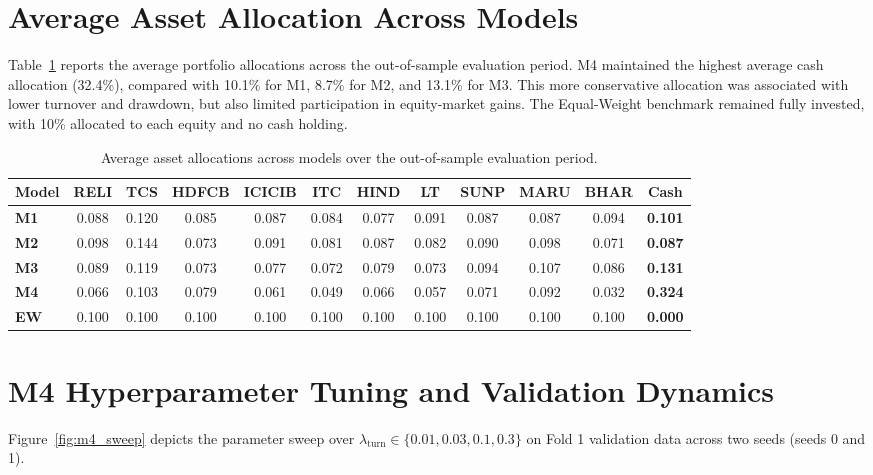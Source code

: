 \section{Average Asset Allocation Across Models}
Table~\ref{tab:avg_weights} reports the average portfolio allocations across the out-of-sample evaluation period. M4 maintained the highest average cash allocation (32.4\%), compared with 10.1\% for M1, 8.7\% for M2, and 13.1\% for M3. This more conservative allocation was associated with lower turnover and drawdown, but also limited participation in equity-market gains. The Equal-Weight benchmark remained fully invested, with 10\% allocated to each equity and no cash holding.

\begin{table}[H]
\centering
\footnotesize
\setlength{\tabcolsep}{3.8pt}
\caption{Average asset allocations across models over the out-of-sample evaluation period.}
\label{tab:avg_weights}
\begin{tabular}{lccccccccccc}
\toprule
\textbf{Model} & \textbf{RELI} & \textbf{TCS} & \textbf{HDFCB} & \textbf{ICICIB} & \textbf{ITC} & \textbf{HIND} & \textbf{LT} & \textbf{SUNP} & \textbf{MARU} & \textbf{BHAR} & \textbf{Cash} \\
\midrule
\textbf{M1} & 0.088 & 0.120 & 0.085 & 0.087 & 0.084 & 0.077 & 0.091 & 0.087 & 0.087 & 0.094 & \textbf{0.101} \\
\textbf{M2} & 0.098 & 0.144 & 0.073 & 0.091 & 0.081 & 0.087 & 0.082 & 0.090 & 0.098 & 0.071 & \textbf{0.087} \\
\textbf{M3} & 0.089 & 0.119 & 0.073 & 0.077 & 0.072 & 0.079 & 0.073 & 0.094 & 0.107 & 0.086 & \textbf{0.131} \\
\textbf{M4} & 0.066 & 0.103 & 0.079 & 0.061 & 0.049 & 0.066 & 0.057 & 0.071 & 0.092 & 0.032 & \textbf{0.324} \\
\textbf{EW} & 0.100 & 0.100 & 0.100 & 0.100 & 0.100 & 0.100 & 0.100 & 0.100 & 0.100 & 0.100 & \textbf{0.000} \\
\bottomrule
\end{tabular}
\end{table}

\section{M4 Hyperparameter Tuning and Validation Dynamics}
Figure~\ref{fig:m4_sweep} depicts the parameter sweep over $\lambda_{\text{turn}} \in \{0.01, 0.03, 0.1, 0.3\}$ on Fold 1 validation data across two seeds (seeds 0 and 1).

